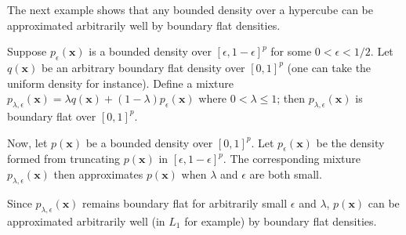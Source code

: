 The next example shows that any bounded density over a hypercube can
be approximated arbitrarily well by boundary flat densities.

\begin{example}
\label{ex:mixture_approx}
Suppose $p_\epsilon(\mathbf{x})$ is a bounded density over $[\epsilon,
  1-\epsilon]^p$ for some $0 < \epsilon < 1/2$. Let $q(\mathbf{x})$ be
an arbitrary boundary flat density over $[0,1]^p$ (one can take the
uniform density for instance). Define a mixture $p_{\lambda,
  \epsilon}(\mathbf{x}) = \lambda q(\mathbf{x}) + (1-\lambda)
p_\epsilon(\mathbf{x})$ where $0 < \lambda \leq 1$; then $p_{\lambda,
  \epsilon}(\mathbf{x})$ is boundary flat over $[0,1]^p$.

Now, let $p(\mathbf{x})$ be a bounded density over $[0,1]^p$. Let
$p_\epsilon(\mathbf{x})$ be the density formed from truncating
$p(\mathbf{x})$ in $[\epsilon, 1-\epsilon]^p$. The corresponding
mixture $p_{\lambda,\epsilon}(\mathbf{x})$ then approximates
$p(\mathbf{x})$ when $\lambda$ and $\epsilon$ are both small.

Since $p_{\lambda,\epsilon}(\mathbf{x})$ remains boundary flat for
arbitrarily small $\epsilon$ and $\lambda$, $p(\mathbf{x})$ can be
approximated arbitrarily well (in $L_1$ for example) by boundary flat
densities.
\end{example}






